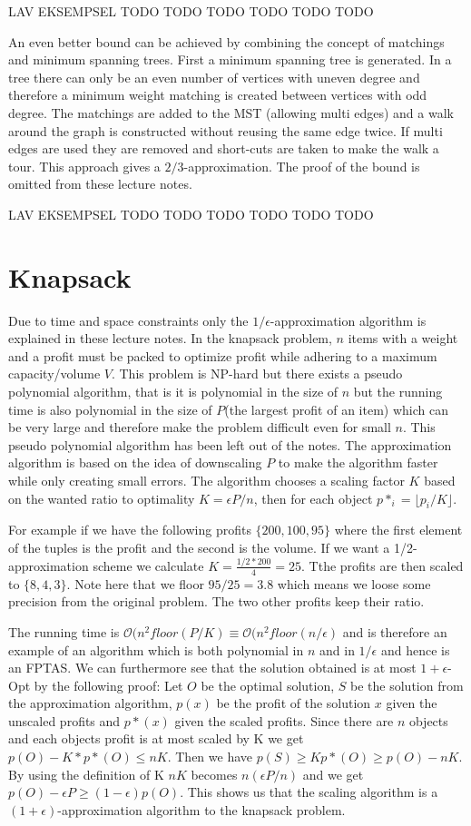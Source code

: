 \newpar LAV EKSEMPSEL TODO TODO TODO TODO TODO TODO

\newpar An even better bound can be achieved by combining the concept of matchings and minimum spanning trees. First a minimum spanning tree is generated. In a tree there can only be an even number of vertices with uneven degree and therefore a minimum weight matching is created between vertices with odd degree. The matchings are added to the MST (allowing multi edges) and a walk around the graph is constructed without reusing the same edge twice. If multi edges are used they are removed and short-cuts are taken to make the walk a tour. This approach gives a $2/3$-approximation. The proof of the bound is omitted from these lecture notes.

\newpar LAV EKSEMPSEL TODO TODO TODO TODO TODO TODO

\section{Knapsack}
Due to time and space constraints only the $1/\epsilon$-approximation algorithm is explained in these lecture notes. In the knapsack problem, $n$ items with a weight and a profit must be packed to optimize profit while adhering to a maximum capacity/volume $V$. This problem is NP-hard but there exists a pseudo polynomial algorithm, that is it is polynomial in the size of $n$ but the running time is also polynomial in the size of $P$(the largest profit of an item) which can be very large and therefore make the problem difficult even for small $n$. This pseudo polynomial algorithm has been left out of the notes. The approximation algorithm is based on the idea of downscaling $P$ to make the algorithm faster while only creating small errors. The algorithm chooses a scaling factor $K$ based on the wanted ratio to optimality $K=\epsilon P/n$, then for each object $p*_i = \lfloor p_i/K \rfloor$.

For example if we have the following profits $\{ 200, 100, 95 \}$ where the first element of the tuples is the profit and the second is the volume. If we want a 1/2-approximation scheme we calculate $K=\frac{1/2*200}{4} = 25$. Tthe profits are then scaled to $\{ 8, 4, 3 \}$. Note here that we floor $95/25=3.8$ which means we loose some precision from the original problem. The two other profits keep their ratio.

\newpar The running time is $\mathcal{O}(n^2 floor(P/K) \equiv \mathcal{O}(n^2 floor(n/\epsilon)$ and is therefore an example of an algorithm which is both polynomial in $n$ and in $1/\epsilon$ and hence is an FPTAS. We can furthermore see that the solution obtained is at most $1+\epsilon$-Opt by the following proof: Let $O$ be the optimal solution, $S$ be the solution from the approximation algorithm, $p(x)$ be the profit of the solution $x$ given the unscaled profits and $p*(x)$ given the scaled profits. Since there are $n$ objects and each objects profit is at most scaled by K we get $p(O) - K*p*(O) \le nK$. Then we have $p(S) \ge Kp*(O) \ge p(O)-n K$. By using the definition of K $n K$ becomes $n (\epsilon P/n)$ and we get $p(O) - \epsilon P \ge (1-\epsilon) p(O)$. This shows us that the scaling algorithm is a $(1+\epsilon)$-approximation algorithm to the knapsack problem.
